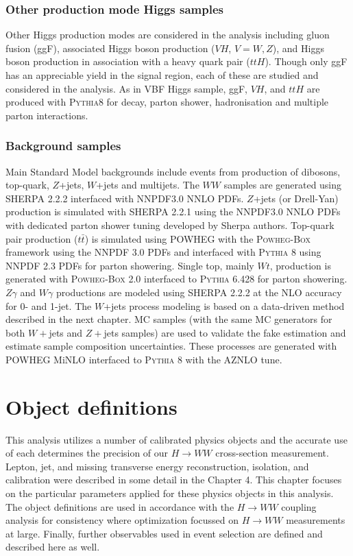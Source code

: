 \subsubsection{Other production mode Higgs samples}

Other Higgs production modes are considered in the analysis including gluon fusion (ggF), associated Higgs boson production ($VH$, $V=W,Z$), and Higgs boson production in association with a heavy quark pair ($ttH$). Though only ggF has an appreciable yield in the signal region, each of these are studied and considered in the analysis. As in VBF Higgs sample, ggF, $VH$, and $ttH$ are produced with \textsc{Pythia8}\cite{pythia,Sjostrand:2007gs} for decay, parton shower, hadronisation and multiple parton interactions.
 
\subsubsection{Background samples}
\label{sec:bkgMC}

Main Standard Model backgrounds include events from production of dibosons, top-quark, $Z$+jets, $W$+jets and multijets. The $WW$ samples are generated using \textsc{SHERPA} 2.2.2 interfaced with NNPDF3.0 NNLO PDFs. $Z$+jets (or Drell-Yan) production is simulated with \textsc{SHERPA} 2.2.1 using the NNPDF3.0 NNLO PDFs with dedicated parton shower tuning developed by Sherpa authors. Top-quark pair production ($t\bar{t}$) is simulated using \textsc{POWHEG} with the \textsc{Powheg-Box} framework using the NNPDF 3.0 PDFs and interfaced with \textsc{Pythia 8} using NNPDF 2.3 PDFs for parton showering. Single top, mainly $Wt$, production is generated with \textsc{Powheg-Box} 2.0 interfaced to \textsc{Pythia} 6.428 for parton showering. $Z\gamma$ and $W\gamma$ productions are modeled using \textsc{SHERPA} 2.2.2 at the NLO accuracy for 0- and 1-jet. The $W$+jets process modeling is based on a data-driven method described in the next chapter. MC samples (with the same MC generators for both $W+$jets and $Z+$jets samples) are used to validate the fake estimation and estimate sample composition uncertainties. These processes are generated with \textsc{POWHEG} MiNLO interfaced to \textsc{Pythia 8} with the AZNLO tune. 

\section{Object definitions}
This analysis utilizes a number of calibrated physics objects and the accurate use of each determines the precision of our $H\rightarrow WW$ cross-section measurement. Lepton, jet, and missing transverse energy reconstruction, isolation, and calibration were described in some detail in the Chapter 4. This chapter focuses on the particular parameters applied for these physics objects in this analysis. The object definitions are used in accordance with the $H\rightarrow WW$ coupling analysis for consistency where optimization focussed on $H \rightarrow WW$ measurements at large. Finally, further observables used in event selection are defined and described here as well. 

